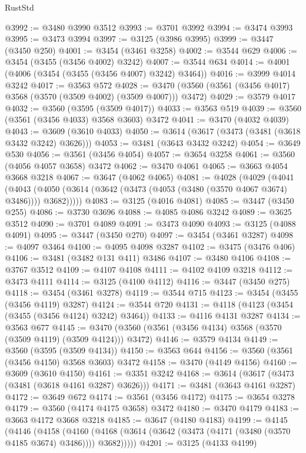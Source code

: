 \begin{lexlean}{RustStd}
\begin{coremodule}
{\begin{coremodule}
{{{{{{{{{{{{{{{{{{{{{{{{{{{{{{{{{{{{{{{{{{{{{@3992 := @3480 @3990 @3512
@3993 := @3701 @3992
@3994 := @3474 @3993
@3995 := @3473 @3994
@3997 := @3125 (@3986 @3995)
@3999 := @3447 (@3450 @250)
@4001 := @3454 (@3461 @3258)
@4002 := @3544 @629
@4006 := @3454 (@3455 (@3456 @4002) @3242)
@4007 := @3544 @634
@4014 := @4001 (@4006 (@3454 (@3455 (@3456 @4007) @3242) @3464))
@4016 := @3999 @4014 @3242
@4017 := @3563 @572
@4028 := @3470 (@3560 (@3561 (@3456 @4017) @3568 (@3570 (@3509 @4002) (@3509 @4007))) @3472)
@4029 := @3579 @4017
@4032 := @3560 (@3595 (@3509 @4017))
@4033 := @3563 @519
@4039 := @3560 (@3561 (@3456 @4033) @3568 @3603) @3472
@4041 := @3470 (@4032 @4039)
@4043 := @3609 (@3610 @4033)
@4050 := @3614 (@3617 (@3473 (@3481 (@3618 @3432 @3242) @3626)))
@4053 := @3481 (@3643 @3432 @3242)
@4054 := @3649 @530
@4056 := @3561 (@3456 @4054)
@4057 := @3654 @3258
@4061 := @3560 (@4056 @4057 @3658) @3472
@4062 := @3470 @4061
@4065 := @3663 @4054 @3668 @3218
@4067 := @3647 (@4062 @4065)
@4081 := @4028
    (@4029
      (@4041
        (@4043 (@4050 (@3614 (@3642 (@3473 (@4053 (@3480 (@3570 @4067 @3674) @3486)))) @3682)))))
@4083 := @3125 (@4016 @4081)
@4085 := @3447 (@3450 @255)
@4086 := @3730 @3696
@4088 := @4085 @4086 @3242
@4089 := @3625 @3512
@4090 := @3701 @4089
@4091 := @3473 @4090
@4093 := @3125 (@4088 @4091)
@4095 := @3447 (@3450 @270)
@4097 := @3454 (@3461 @3287)
@4098 := @4097 @3464
@4100 := @4095 @4098 @3287
@4102 := @3475 (@3476 @406)
@4106 := @3481 (@3482 @131 @411) @3486
@4107 := @3480 @4106
@4108 := @3767 @3512
@4109 := @4107 @4108
@4111 := @4102 @4109 @3218
@4112 := @3473 @4111
@4114 := @3125 (@4100 @4112)
@4116 := @3447 (@3450 @275)
@4118 := @3454 (@3461 @3278)
@4119 := @3544 @715
@4123 := @3454 (@3455 (@3456 @4119) @3287)
@4124 := @3544 @720
@4131 := @4118 (@4123 (@3454 (@3455 (@3456 @4124) @3242) @3464))
@4133 := @4116 @4131 @3287
@4134 := @3563 @677
@4145 := @3470 (@3560 (@3561 (@3456 @4134) @3568 (@3570 (@3509 @4119) (@3509 @4124))) @3472)
@4146 := @3579 @4134
@4149 := @3560 (@3595 (@3509 @4134))
@4150 := @3563 @644
@4156 := @3560 (@3561 (@3456 @4150) @3568 @3603) @3472
@4158 := @3470 (@4149 @4156)
@4160 := @3609 (@3610 @4150)
@4161 := @3351 @3242
@4168 := @3614 (@3617 (@3473 (@3481 (@3618 @4161 @3287) @3626)))
@4171 := @3481 (@3643 @4161 @3287)
@4172 := @3649 @672
@4174 := @3561 (@3456 @4172)
@4175 := @3654 @3278
@4179 := @3560 (@4174 @4175 @3658) @3472
@4180 := @3470 @4179
@4183 := @3663 @4172 @3668 @3218
@4185 := @3647 (@4180 @4183)
@4199 := @4145
    (@4146
      (@4158
        (@4160 (@4168 (@3614 (@3642 (@3473 (@4171 (@3480 (@3570 @4185 @3674) @3486)))) @3682)))))
@4201 := @3125 (@4133 @4199)
}}}}}}}}}}}}}}}}}}}}}}}}}}}}}}}}}}}}}}}}}}}}}
\end{coremodule}}
\end{coremodule}
\end{lexlean}

